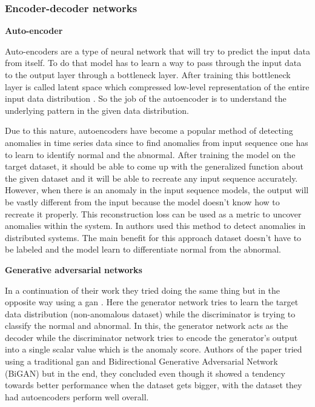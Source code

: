\subsubsection{Encoder-decoder networks}

\textbf{Auto-encoder}

Auto-encoders are a type of neural network that will try to predict the input data from itself. To do that model has to learn a way to pass through the input data to the output layer through a bottleneck layer. After training this bottleneck layer is called latent space which compressed low-level representation of the entire input data distribution \citep{hinton2006reducing}. So the job of the autoencoder is to understand the underlying pattern in the given data distribution.

Due to this nature, autoencoders have become a popular method of detecting anomalies in time series data since to find anomalies from input sequence one has to learn to identify normal and the abnormal. After training the model on the target dataset, it should be able to come up with the generalized function about the given dataset and it will be able to recreate any input sequence accurately. However, when there is an anomaly in the input sequence models, the output will be vastly different from the input because the model doesn't know how to recreate it properly. This reconstruction loss can be used as a metric to uncover anomalies within the system. In \cite{kumarage2018anomaly} authors used this method to detect anomalies in distributed systems. The main benefit for this approach dataset doesn't have to be labeled and the model learn to differentiate normal from the abnormal.

\textbf{Generative adversarial networks}

In a continuation of their work \cite{kumarage2019generative} they tried doing the same thing but in the opposite way using a \ac{gan} \citep{goodfellow2014generative}. Here the generator network tries to learn the target data distribution (non-anomalous dataset) while the discriminator is trying to classify the normal and abnormal. In this, the generator network acts as the decoder while the discriminator network tries to encode the generator's output into a single scalar value which is the anomaly score. Authors of the paper tried using a traditional \ac{gan} and Bidirectional Generative Adversarial Network (BiGAN) \citep{donahue2016adversarial} but in the end, they concluded even though it showed a tendency towards better performance when the dataset gets bigger, with the dataset they had autoencoders perform well overall.

